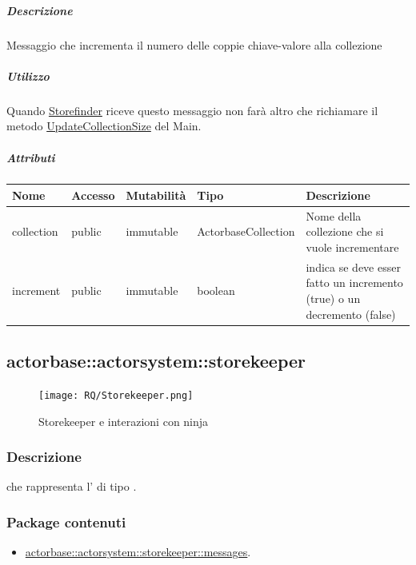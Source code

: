 \documentclass{scalatekids-article}
\begin{document}
\subparagraph{Descrizione}

Messaggio che incrementa il numero delle coppie chiave-valore alla collezione

\subparagraph{Utilizzo}

Quando \hyperref[sec:actorbase::actorsystem::storefinder::Storefinder]{Storefinder}
riceve questo messaggio non farà altro che richiamare il metodo
\hyperref[sec:actorbase::actorsystem::main::messages::UpdateCollectionSize]{UpdateCollectionSize} del Main.

\subparagraph{Attributi}
\begin{tabular}{| p{3cm} | p{1.5cm} | p{2cm} | p{2cm} | p{8.5cm} |}
  \hline
  Nome & Accesso & Mutabilità & Tipo & Descrizione\\
  \hline
  collection & public & immutable & ActorbaseCollection & Nome della collezione che si vuole incrementare\\
  \hline
  increment & public & immutable & boolean & indica se deve esser fatto un incremento (true) o un decremento (false)\\
  \hline
\end{tabular}


\subsection{actorbase::actorsystem::storekeeper}
\label{sec:actorbase::actorsystem::storekeeper}

\begin{figure}[H]
  \begin{center}
    \texttt{[image: RQ/Storekeeper.png]}
    \caption{Storekeeper e interazioni con ninja}
  \end{center}
\end{figure}

\subsubsection{Descrizione}
 che rappresenta l' di tipo .

\subsubsection{Package contenuti}
\begin{itemize}
\item \hyperref[sec:actorbase::actorsystem::storekeeper::messages]{actorbase::actorsystem::storekeeper::messages}.
\end{itemize}
\end{document}
